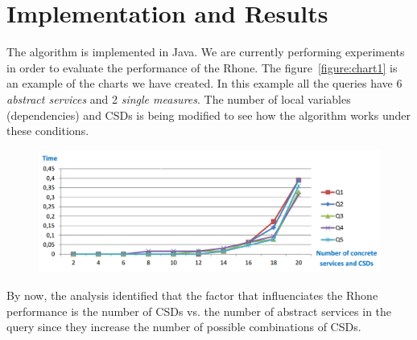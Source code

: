 \section{Implementation and Results}
\label{sec:implementationandresults}  
The algorithm is implemented in Java. 
We are currently performing experiments in order to evaluate the performance of the Rhone. 
The figure~\ref{figure:chart1} is an example of the charts we have created.
In this example all the queries have 6 \textit{abstract services} and 2 \textit{single measures}. The number of local variables (dependencies) and CSDs is being modified to see how the algorithm works under these conditions.
\begin{center}
\begin{figure}[h!]
\includegraphics[scale=0.3]{chart1.PNG} 
\end{figure}\label{figure:chart1}
\end{center}

By now, the analysis identified that the factor that influenciates the Rhone
performance is the number of CSDs vs. the number of abstract services in the
query since they increase the number of possible combinations of CSDs.   
